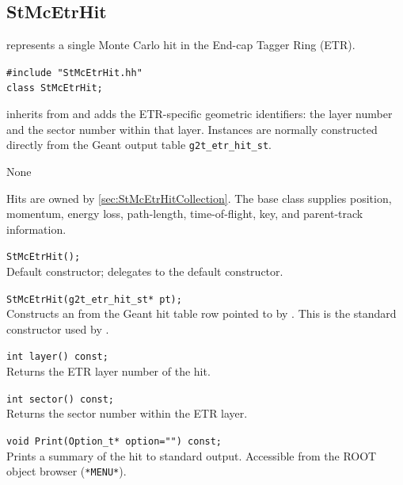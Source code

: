 \subsection{StMcEtrHit}
 
\label{sec:StMcEtrHit}
\begin{Entry}
\item[Summary]
     represents a single Monte Carlo hit in the
    End-cap Tagger Ring (ETR).

\item[Synopsis]
    \verb+#include "StMcEtrHit.hh"+\\
    \verb+class StMcEtrHit;+\\

\item[Description]
     inherits from  and adds the
    ETR-specific geometric identifiers: the layer number and the
    sector number within that layer.  Instances are normally
    constructed directly from the Geant output table
    \verb+g2t_etr_hit_st+.

\item[Persistence]
    None

\item[Related Classes]
    Hits are owned by 
    \ref{sec:StMcEtrHitCollection}.
    The base class  supplies position, momentum,
    energy loss, path-length, time-of-flight, key, and parent-track
    information.

\item[Public\\ Constructors]
    \verb+StMcEtrHit();+\\
    Default constructor; delegates to the  default constructor.

    \verb+StMcEtrHit(g2t_etr_hit_st* pt);+\\
    Constructs an  from the Geant hit table row pointed to
    by .  This is the standard constructor used by
    .

\item[Public Member\\ Functions]
    \verb+int layer() const;+\\
    Returns the ETR layer number of the hit.

    \verb+int sector() const;+\\
    Returns the sector number within the ETR layer.

    \verb+void Print(Option_t* option="") const;+\\
    Prints a summary of the hit to standard output.  Accessible
    from the ROOT object browser (\verb+*MENU*+).

\end{Entry}
\clearpage
%
%
